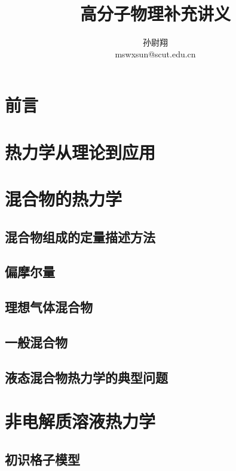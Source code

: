 \documentclass[
  zihao=5,
  linespread=1.3,
  a4paper,
  heading=true,
  twoside
]{ctexbook}
\title{高分子物理补充讲义}
\author{孙尉翔\\mswxsun@scut.edu.cn}
\theoremstyle{definition}
\theoremstyle{plain}
\begin{document}
\maketitle
\frontmatter
\pagestyle{fancy}
\chapter*{前言}\label{sec:preface}


\tableofcontents
\mainmatter
\chapter{热力学从理论到应用}\label{sec:I_thermodynamic_relations}


\chapter{混合物的热力学}\label{sec:II 混合物的热力学}
\section{混合物组成的定量描述方法}\label{sec:II.1 composition_measures}

\section{偏摩尔量}\label{sec:II.2 partial_molar_quantities}

\section{理想气体混合物}\label{sec:II.3 ideal_mixture.tex}

\section{一般混合物}\label{sec:II.4 real_mixture}

\section{液态混合物热力学的典型问题}\label{sec:II.5 typical_problems}


\chapter{非电解质溶液热力学}

\section{初识格子模型}

\end{document}
